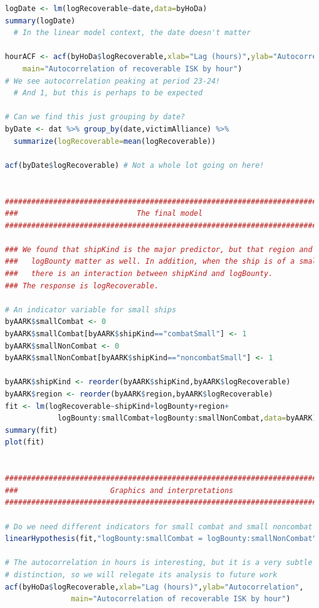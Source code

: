 \documentclass[letterpaper,12pt,article]{memoir}
\begin{document}
{\begin{lstlisting}[language=R]
logDate <- lm(logRecoverable~date,data=byHoDa)
summary(logDate)
  # In the linear model context, the date doesn't matter

hourACF <- acf(byHoDa$logRecoverable,xlab="Lag (hours)",ylab="Autocorrelation",
    main="Autocorrelation of recoverable ISK by hour")
# We see autocorrelation peaking at period 23-24!
  # And 1, but this is perhaps to be expected

# Can we find this just grouping by date?
byDate <- dat %>% group_by(date,victimAlliance) %>% 
  summarize(logRecoverable=mean(logRecoverable))

acf(byDate$logRecoverable) # Not a whole lot going on here!


###############################################################################
###                           The final model                               ###
###############################################################################

### We found that shipKind is the major predictor, but that region and
###   logBounty matter as well. In addition, when the ship is of a small kind,
###   there is an interaction between shipKind and logBounty.
### The response is logRecoverable.

# An indicator variable for small ships
byAARK$smallCombat <- 0
byAARK$smallCombat[byAARK$shipKind=="combatSmall"] <- 1
byAARK$smallNonCombat <- 0
byAARK$smallNonCombat[byAARK$shipKind=="noncombatSmall"] <- 1

byAARK$shipKind <- reorder(byAARK$shipKind,byAARK$logRecoverable)
byAARK$region <- reorder(byAARK$region,byAARK$logRecoverable)
fit <- lm(logRecoverable~shipKind+logBounty+region+
            logBounty:smallCombat+logBounty:smallNonCombat,data=byAARK)
summary(fit)
plot(fit)


###############################################################################
###                     Graphics and interpretations                        ###
###############################################################################

# Do we need different indicators for small combat and small noncombat ships?
linearHypothesis(fit,"logBounty:smallCombat = logBounty:smallNonCombat") # yes

# The autocorrelation in hours is interesting, but it is a very subtle 
# distinction, so we will relegate its analysis to future work
acf(byHoDa$logRecoverable,xlab="Lag (hours)",ylab="Autocorrelation",
               main="Autocorrelation of recoverable ISK by hour")



\end{lstlisting}}
\end{document}
